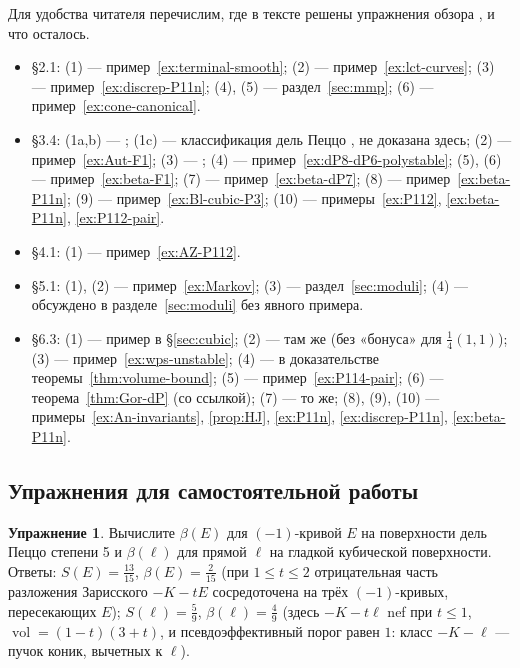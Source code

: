 \documentclass[11pt,a4paper]{article}
\theoremstyle{plain}
\theoremstyle{definition}
\newtheorem{exercise}[theorem]{Упражнение}
\theoremstyle{remark}
\DeclareMathOperator{\vol}{vol}
\begin{document}
Для удобства читателя перечислим, где в тексте решены упражнения обзора \cite{DeV}, и что осталось.
\begin{itemize}
\item \S2.1: (1) --- пример~\ref{ex:terminal-smooth}; (2) --- пример~\ref{ex:lct-curves}; (3) ---
пример~\ref{ex:discrep-P11n}; (4), (5) --- раздел~\ref{sec:mmp}; (6) --- пример~\ref{ex:cone-canonical}.
\item \S3.4: (1a,b) --- \cite[\S\,7]{AG}; (1c) --- классификация дель Пеццо \cite[6.10]{AG}, не
доказана здесь; (2) --- пример~\ref{ex:Aut-F1}; (3) --- \cite[7.7]{AG}; (4) ---
пример~\ref{ex:dP8-dP6-polystable}; (5), (6) --- пример~\ref{ex:beta-F1}; (7) --- пример~\ref{ex:beta-dP7};
(8) --- пример~\ref{ex:beta-P11n}; (9) --- пример~\ref{ex:Bl-cubic-P3}; (10) --- примеры~\ref{ex:P112},
\ref{ex:beta-P11n}, \ref{ex:P112-pair}.
\item \S4.1: (1) --- пример~\ref{ex:AZ-P112}.
\item \S5.1: (1), (2) --- пример~\ref{ex:Markov}; (3) --- раздел~\ref{sec:moduli}; (4) --- обсуждено в
разделе~\ref{sec:moduli} без явного примера.
\item \S6.3: (1) --- пример в \S\ref{sec:cubic}; (2) --- там же (без «бонуса» для $\frac14(1,1)$);
(3) --- пример~\ref{ex:wps-unstable}; (4) --- в доказательстве теоремы~\ref{thm:volume-bound}; (5)
--- пример~\ref{ex:P114-pair}; (6) --- теорема~\ref{thm:Gor-dP} (со ссылкой); (7) --- то же;
(8), (9), (10) --- примеры~\ref{ex:An-invariants}, \ref{prop:HJ}, \ref{ex:P11n}, \ref{ex:discrep-P11n},
\ref{ex:beta-P11n}.
\end{itemize}

\subsection*{Упражнения для самостоятельной работы}

\begin{exercise}
Вычислите $\beta(E)$ для $(-1)$-кривой $E$ на поверхности дель Пеццо степени 5 и $\beta(\ell)$ для
прямой $\ell$ на гладкой кубической поверхности. Ответы: $S(E)=\frac{13}{15}$, $\beta(E)=\frac2{15}$
(при $1\le t\le2$ отрицательная часть разложения Зарисского $-K-tE$ сосредоточена на трёх
$(-1)$-кривых, пересекающих $E$); $S(\ell)=\frac59$, $\beta(\ell)=\frac49$ (здесь $-K-t\ell$ nef при
$t\le1$, $\vol=(1-t)(3+t)$, и псевдоэффективный порог равен $1$: класс $-K-\ell$ --- пучок
коник, вычетных к $\ell$).
\end{exercise}
\end{document}
